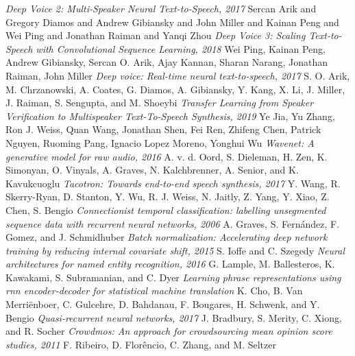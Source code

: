 \documentclass[twosided]{article}
\begin{document}
\begin{thebibliography}{99}
\textit{Deep Voice 2: Multi-Speaker Neural Text-to-Speech, 2017}
Sercan Arik and Gregory Diamos and Andrew Gibiansky and John Miller and Kainan Peng and Wei Ping and Jonathan Raiman and Yanqi Zhou
\textit{Deep Voice 3: Scaling Text-to-Speech with Convolutional Sequence Learning, 2018}
Wei Ping, Kainan Peng, Andrew Gibiansky, Sercan O. Arik, Ajay Kannan, Sharan Narang, Jonathan Raiman, John Miller
\textit{Deep voice: Real-time neural text-to-speech, 2017}
S. O. Arik, M. Chrzanowski, A. Coates, G. Diamos, A. Gibiansky, Y. Kang, X. Li, J. Miller, J. Raiman, S. Sengupta, and M. Shoeybi
\textit{Transfer Learning from Speaker Verification to Multispeaker Text-To-Speech Synthesis, 2019}
Ye Jia, Yu Zhang, Ron J. Weiss, Quan Wang, Jonathan Shen, Fei Ren, Zhifeng Chen, Patrick Nguyen, Ruoming Pang, Ignacio Lopez Moreno, Yonghui Wu
\textit{Wavenet: A generative model for raw audio, 2016}
A. v. d. Oord, S. Dieleman, H. Zen, K. Simonyan, O. Vinyals, A. Graves, N. Kalchbrenner, A. Senior, and K. Kavukcuoglu
\textit{Tacotron: Towards end-to-end speech synthesis, 2017}
Y. Wang, R. Skerry-Ryan, D. Stanton, Y. Wu, R. J. Weiss, N. Jaitly, Z. Yang, Y. Xiao, Z. Chen, S. Bengio
\textit{Connectionist temporal classification: labelling unsegmented sequence data with recurrent neural networks, 2006}
A. Graves, S. Fernández, F. Gomez, and J. Schmidhuber
\textit{Batch normalization: Accelerating deep network training by reducing internal covariate shift, 2015}
S. Ioffe and C. Szegedy
\textit{Neural architectures for named entity recognition, 2016}
G. Lample, M. Ballesteros, K. Kawakami, S. Subramanian, and C. Dyer
\textit{Learning phrase representations using rnn encoder-decoder for statistical machine translation}
K. Cho, B. Van Merriënboer, C. Gulcehre, D. Bahdanau, F. Bougares, H. Schwenk, and Y. Bengio
\textit{Quasi-recurrent neural networks, 2017}
J. Bradbury, S. Merity, C. Xiong, and R. Socher
\textit{Crowdmos: An approach for crowdsourcing mean opinion score studies, 2011}
F. Ribeiro, D. Florêncio, C. Zhang, and M. Seltzer
\end{thebibliography}
\end{document}
